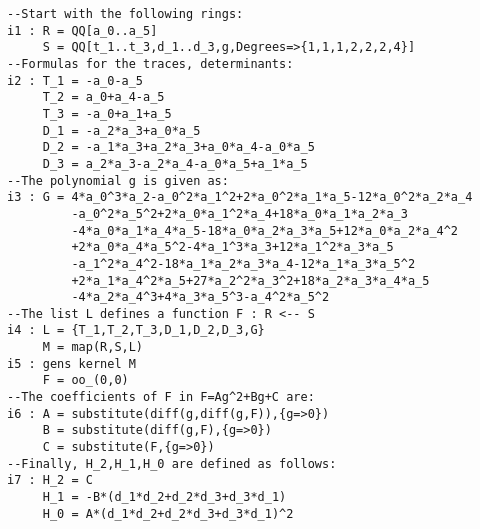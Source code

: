 %
\begin{small} 
\begin{verbatim}
--Start with the following rings:
i1 : R = QQ[a_0..a_5]
     S = QQ[t_1..t_3,d_1..d_3,g,Degrees=>{1,1,1,2,2,2,4}]
--Formulas for the traces, determinants:
i2 : T_1 = -a_0-a_5
     T_2 = a_0+a_4-a_5
     T_3 = -a_0+a_1+a_5
     D_1 = -a_2*a_3+a_0*a_5
     D_2 = -a_1*a_3+a_2*a_3+a_0*a_4-a_0*a_5
     D_3 = a_2*a_3-a_2*a_4-a_0*a_5+a_1*a_5
--The polynomial g is given as:
i3 : G = 4*a_0^3*a_2-a_0^2*a_1^2+2*a_0^2*a_1*a_5-12*a_0^2*a_2*a_4
         -a_0^2*a_5^2+2*a_0*a_1^2*a_4+18*a_0*a_1*a_2*a_3
         -4*a_0*a_1*a_4*a_5-18*a_0*a_2*a_3*a_5+12*a_0*a_2*a_4^2
         +2*a_0*a_4*a_5^2-4*a_1^3*a_3+12*a_1^2*a_3*a_5
         -a_1^2*a_4^2-18*a_1*a_2*a_3*a_4-12*a_1*a_3*a_5^2
         +2*a_1*a_4^2*a_5+27*a_2^2*a_3^2+18*a_2*a_3*a_4*a_5
         -4*a_2*a_4^3+4*a_3*a_5^3-a_4^2*a_5^2  
--The list L defines a function F : R <-- S
i4 : L = {T_1,T_2,T_3,D_1,D_2,D_3,G} 
     M = map(R,S,L)
i5 : gens kernel M
     F = oo_(0,0)
--The coefficients of F in F=Ag^2+Bg+C are:
i6 : A = substitute(diff(g,diff(g,F)),{g=>0})
     B = substitute(diff(g,F),{g=>0})
     C = substitute(F,{g=>0})
--Finally, H_2,H_1,H_0 are defined as follows:
i7 : H_2 = C
     H_1 = -B*(d_1*d_2+d_2*d_3+d_3*d_1)
     H_0 = A*(d_1*d_2+d_2*d_3+d_3*d_1)^2
\end{verbatim}
\end{small}